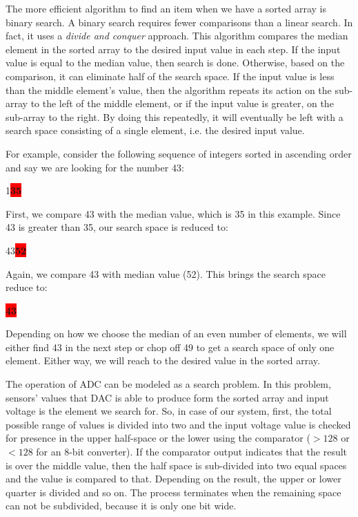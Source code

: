 \documentclass[12pt, logo=tehranDLDL/ut]{tehranDLDL}
\begin{document}
The more efficient algorithm to find an item when we have a sorted array is binary search. A binary search requires fewer comparisons than a linear search. In fact, it uses a \textit{divide and conquer} approach. This algorithm compares the median element in the sorted array to the desired input value in each step. If the input value is equal to the median value, then search is done. Otherwise, based on the comparison, it can eliminate half of the search space. If the input value is less than the middle element's value, then the algorithm repeats its action on the sub-array to the left of the middle element, or if the input value is greater, on the sub-array to the right. By doing this repeatedly, it will eventually be left with a search space consisting of a single element, i.e. the desired input value.

For example, consider the following sequence of integers sorted in ascending order and say we are looking for the number 43:
\begin{center}
\colorbox{Gray!10}{1\qquad \colorbox{Red}{\color{White}\bfseries 35}}
\end{center}
First, we compare 43 with the median value, which is 35 in this example. Since 43 is greater than 35, our search space is reduced to:
\begin{center}
\colorbox{Gray!10}{43\qquad \colorbox{Red}{\color{White}\bfseries 52}}
\end{center}
Again, we compare 43 with median value (52). This brings the search space reduce to:
\begin{center}
\colorbox{Gray!10}{\colorbox{Red}{\color{White}\bfseries 43}}
\end{center}

Depending on how we choose the median of an even number of elements, we will either find 43 in the next step or chop off 49 to get a search space of only one element. Either way, we will reach to the desired value in the sorted array.

The operation of ADC can be modeled as a search problem. In this problem, sensors' values that DAC is able to produce form the sorted array and input voltage is the element we search for. So, in case of our system, first, the total possible range of values is divided into two and the input voltage value is checked for presence in the upper half-space or the lower using the comparator ($>128$ or $<128$ for an 8-bit converter). If the comparator output indicates that the result is over the middle value, then the half space is sub-divided into two equal spaces and the value is compared to that. Depending on the result, the upper or lower quarter is divided and so on. The process terminates when the remaining space can not be subdivided, because it is only one bit wide.
\end{document}
